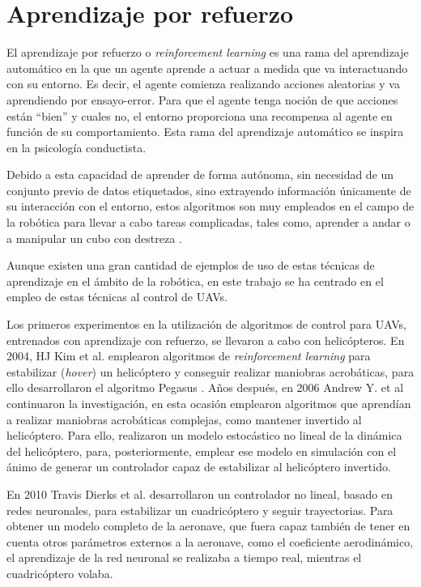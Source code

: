 \section{Aprendizaje por refuerzo}
El aprendizaje por refuerzo o \textit{reinforcement learning} es una rama del aprendizaje automático en  la que un agente aprende a actuar a medida que va interactuando con su entorno. Es decir, el agente comienza realizando acciones aleatorias y va aprendiendo por ensayo-error. Para que el agente tenga noción de que acciones están ``bien'' y cuales no, el entorno proporciona una recompensa al agente en función de su comportamiento. Esta rama del aprendizaje automático se inspira en la psicología conductista.

Debido a esta capacidad de aprender de forma autónoma, sin necesidad de un conjunto previo de datos etiquetados, sino extrayendo información únicamente de su interacción con el entorno, estos algoritmos son muy empleados en el campo de la robótica para llevar a cabo tareas complicadas, tales como, aprender a andar o a manipular un cubo con destreza \cite{andrychowicz2018learning}.

Aunque existen una gran cantidad de ejemplos de uso de estas técnicas de aprendizaje en el ámbito de la robótica, en este trabajo se ha centrado en el empleo de estas técnicas al control de UAVs.

Los primeros experimentos en la utilización de algoritmos de control para UAVs, entrenados con aprendizaje con refuerzo, se llevaron a cabo con helicópteros. En 2004, HJ Kim et al. \cite{kim2004autonomous} emplearon algoritmos de \textit{reinforcement learning} para estabilizar (\textit{hover}) un helicóptero y conseguir realizar maniobras acrobáticas, para ello desarrollaron el algoritmo Pegasus \cite{ng2000pegasus}. Años después, en 2006 Andrew Y. et al \cite{ng2006autonomous} continuaron la investigación, en esta ocasión emplearon algoritmos que aprendían a realizar maniobras acrobáticas complejas, como mantener invertido al helicóptero. Para ello, realizaron un modelo estocástico no lineal de la dinámica del helicóptero, para, posteriormente, emplear ese modelo en simulación con el ánimo de generar un controlador capaz de estabilizar al helicóptero invertido.

En 2010 Travis Dierks et al. \cite{dierks2010output} desarrollaron un controlador no lineal, basado en redes neuronales, para estabilizar un cuadricóptero y seguir trayectorias. Para obtener un modelo completo de la aeronave, que fuera capaz también de tener en cuenta otros parámetros externos a la aeronave, como el coeficiente aerodinámico, el aprendizaje de la red neuronal se realizaba a tiempo real, mientras el cuadricóptero volaba. 

